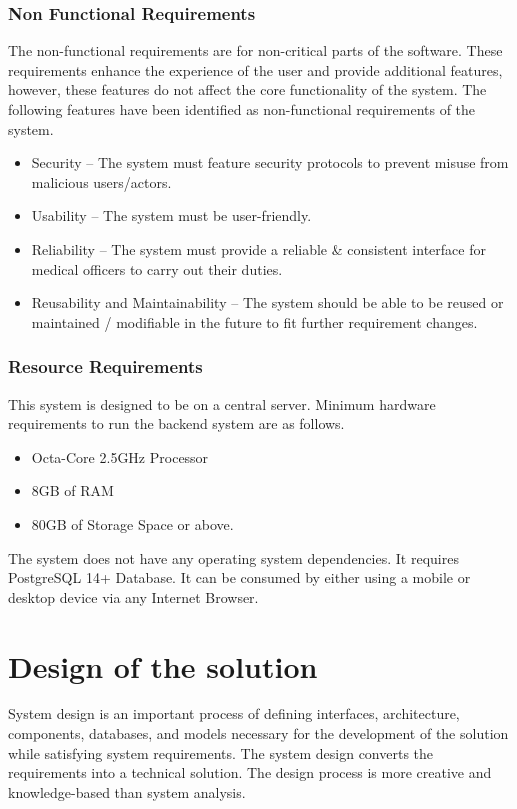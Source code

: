 \documentclass[12pt,a4paper]{report}
\begin{document}
\subsection{Non Functional Requirements}

The non-functional requirements are for non-critical parts of the software. These requirements enhance the experience of the user and provide additional features, however, these features do not affect the core functionality of the system. The following features have been identified as non-functional requirements of the system. 

\begin{itemize}
\item Security – The system must feature security protocols to prevent misuse from malicious users/actors.
\item Usability – The system must be user-friendly. 
\item Reliability – The system must provide a reliable \& consistent interface for medical officers to carry out their duties.
\item Reusability and Maintainability – The system should be able to be reused or maintained / modifiable in the future to fit further requirement changes. 
\end{itemize}

\subsection{Resource Requirements}
This system is designed to be on a central server. Minimum hardware requirements to run the backend system are as follows.
\begin{itemize}
\item Octa-Core 2.5GHz Processor
\item 8GB of RAM
\item 80GB of Storage Space or above. 
\end{itemize}
The system does not have any operating system dependencies. It requires PostgreSQL 14+ Database. It can be consumed by either using a mobile or desktop device via any Internet Browser. 
 
\chapter{Design of the solution}

System design is an important process of defining interfaces, architecture, components, databases, and models necessary for the development of the solution while satisfying system requirements. The system design converts the requirements into a technical solution. The design process is more creative and knowledge-based than system analysis. 
\end{document}
